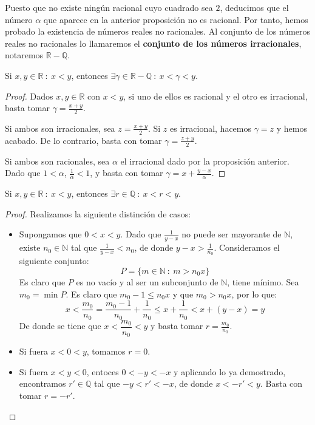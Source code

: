 Puesto que no existe ningún racional cuyo cuadrado sea $2$, deducimos que el número $\alpha$ que aparece en la anterior proposición no es racional. Por tanto, hemos probado la existencia de números
reales no racionales. Al conjunto de los números reales no racionales lo llamaremos el \textbf{conjunto de los números irracionales}, notaremos $\mathbb{R} - \mathbb{Q}$.

\begin{teo}
    Si $x,y \in \mathbb{R} ~:~ x < y$, entonces $\exists \gamma \in \mathbb{R} - \mathbb{Q} ~:~ x < \gamma < y$.
\end{teo}
\begin{proof}
    Dados $x,y \in \mathbb{R}$ con $x < y$, si uno de ellos es racional y el otro es irracional, basta tomar $\gamma = \frac{x+y}{2}$.
    
    Si ambos son irracionales, sea $z=\frac{x+y}{2}$. Si $z$ es irracional, hacemos $\gamma = z$ y hemos acabado.
    De lo contrario, basta con tomar $\gamma = \frac{z+y}{2}$.
    
    Si ambos son racionales, sea $\alpha$ el irracional dado por la proposición anterior. Dado que $1 < \alpha$,
    $\frac{1}{\alpha} < 1$, y basta con tomar $\gamma = x + \frac{y-x}{\alpha}$.
\end{proof}

\begin{teo}
    Si $x,y \in \mathbb{R} ~:~ x < y$, entonces $\exists r \in \mathbb{Q} ~:~ x < r < y$.
\end{teo}
\begin{proof} Realizamos la siguiente distinción de casos:
    \begin{itemize}
        \item Supongamos que $0 < x < y$. Dado que $\frac{1}{y-x}$ no puede ser mayorante de $\mathbb{N}$,
        existe $n_0 \in \mathbb{N}$ tal que $\frac{1}{y-x} < n_0$, de donde $y-x > \frac{1}{n_0}$.
        Consideramos el siguiente conjunto:
        \begin{equation*}
            P=\{m \in \mathbb{N}~:~m > n_0 x\}
        \end{equation*}
        Es claro que $P$ es no vacío y al ser un subconjunto de $\mathbb{N}$, tiene mínimo.
        Sea $m_0= \min P$. Es claro que $m_0 - 1 \leq n_0 x$ y que $m_0 > n_0 x$, por lo que:
        \begin{equation*}
            x < \frac{m_0}{n_0}=\frac{m_0 -1}{n_0}+\frac{1}{n_0} \leq x +\frac{1}{n_0} < x + (y - x) = y
        \end{equation*}
        De donde se tiene que $x < \dfrac{m_0}{n_0} < y$ y basta tomar $r=\frac{m_0}{n_0}$.

        \item Si fuera $x < 0 < y$, tomamos $r=0$.

        \item Si fuera $x < y < 0$, entoces $0 < -y < -x$ y aplicando lo ya demostrado, encontramos $r' \in \mathbb{Q}$ tal que $-y < r' < -x$, de donde $x < -r' < y$. Basta con tomar $r=-r'$.
    \end{itemize}
\end{proof}


